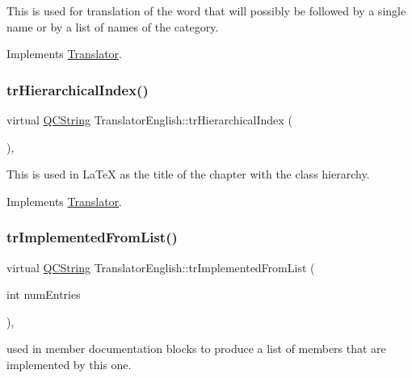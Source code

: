 This is used for translation of the word that will possibly be followed by a single name or by a list of names of the category. 

Implements \mbox{\hyperlink{class_translator}{Translator}}.

\mbox{\label{class_translator_english_a6f9a3261d1f2b39178c4f4d30df52f60}} 
\subsubsection{\texorpdfstring{trHierarchicalIndex()}{trHierarchicalIndex()}}
{\footnotesize\ttfamily virtual \mbox{\hyperlink{class_q_c_string}{Q\+C\+String}} Translator\+English\+::tr\+Hierarchical\+Index (\begin{DoxyParamCaption}{ }\end{DoxyParamCaption})\hspace{0.3cm}{\ttfamily [inline]}, {\ttfamily [virtual]}}

This is used in La\+TeX as the title of the chapter with the class hierarchy. 

Implements \mbox{\hyperlink{class_translator}{Translator}}.

\mbox{\label{class_translator_english_a87490251b5ccd4012cdfad0d29ab7ef9}} 
\subsubsection{\texorpdfstring{trImplementedFromList()}{trImplementedFromList()}}
{\footnotesize\ttfamily virtual \mbox{\hyperlink{class_q_c_string}{Q\+C\+String}} Translator\+English\+::tr\+Implemented\+From\+List (\begin{DoxyParamCaption}\item[{int}]{num\+Entries }\end{DoxyParamCaption})\hspace{0.3cm}{\ttfamily [inline]}, {\ttfamily [virtual]}}

used in member documentation blocks to produce a list of members that are implemented by this one. 

